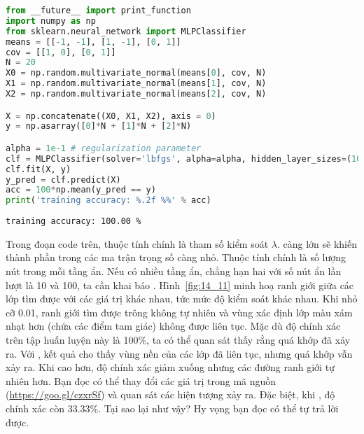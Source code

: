 \begin{lstlisting}[language=Python]
from __future__ import print_function
import numpy as np
from sklearn.neural_network import MLPClassifier
means = [[-1, -1], [1, -1], [0, 1]]
cov = [[1, 0], [0, 1]]
N = 20
X0 = np.random.multivariate_normal(means[0], cov, N)
X1 = np.random.multivariate_normal(means[1], cov, N)
X2 = np.random.multivariate_normal(means[2], cov, N)

X = np.concatenate((X0, X1, X2), axis = 0)
y = np.asarray([0]*N + [1]*N + [2]*N)

alpha = 1e-1 # regularization parameter
clf = MLPClassifier(solver='lbfgs', alpha=alpha, hidden_layer_sizes=(100))
clf.fit(X, y)
y_pred = clf.predict(X)
acc = 100*np.mean(y_pred == y)
print('training accuracy: %.2f %%' % acc)
\end{lstlisting}
\kq
\begin{lstlisting}
training accuracy: 100.00 %
\end{lstlisting}

Trong đoạn code trên, thuộc tính  chính là tham số
kiểm soát $\lambda$.  càng lớn sẽ khiến thành phần trong các ma
trận trọng số càng nhỏ. Thuộc tính  chính là số
lượng nút trong mỗi tầng ẩn. Nếu có nhiều tầng ẩn, chẳng hạn
hai với số nút ẩn lần lượt là 10 và 100, ta cần khai báo
. Hình~\ref{fig:14_11} minh hoạ ranh
giới giữa các lớp tìm được với các giá trị  khác nhau, tức
mức độ kiểm soát khác nhau. Khi  nhỏ cỡ 0.01, ranh
giới tìm được trông không tự nhiên và vùng xác định lớp màu xám nhạt hơn (chứa các điểm tam giác) không được
liên tục. Mặc dù độ chính xác trên tập huấn luyện này là 100\%, ta có thể quan
sát thấy rằng quá khớp đã xảy ra. Với , kết quả cho
thấy vùng nền của các lớp đã liên tục, nhưng quá khớp vẫn xảy ra.
Khi  cao hơn, độ chính xác giảm xuống nhưng các đường
ranh giới tự nhiên hơn. Bạn đọc có thể thay đổi các giá trị 
trong mã nguồn (\url{https://goo.gl/czxrSf}) và quan sát các hiện tượng xảy
ra. Đặc biệt, khi , độ chính xác còn 33.33\%. Tại sao
lại như vậy? Hy vọng bạn đọc có thể tự trả lời được.

